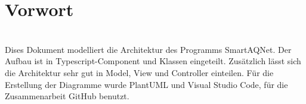 \section{Vorwort}
\\Dises Dokument modelliert die Architektur des Programms SmartAQNet. Der Aufbau ist in Typescript-Component und Klassen eingeteilt. Zusätzlich lässt sich die Architektur sehr gut in Model, View und Controller einteilen. Für die Erstellung der Diagramme wurde PlantUML und Visual Studio Code, für die Zusammenarbeit GitHub benutzt.
